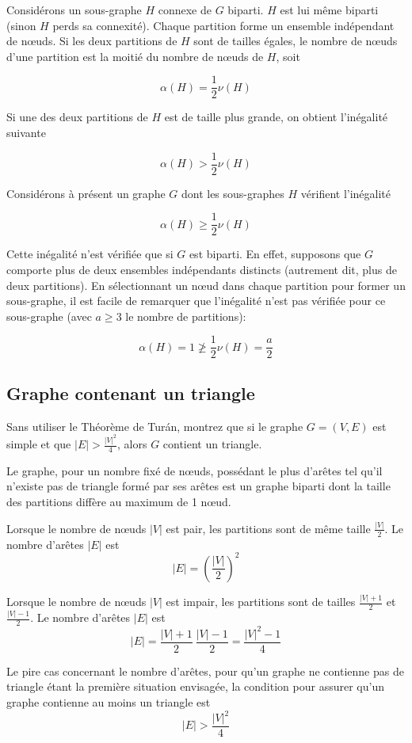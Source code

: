 \begin{solution}
Considérons un sous-graphe $H$ connexe de $G$ biparti. $H$ est lui même biparti (sinon $H$ perds sa connexité).
Chaque partition forme un ensemble indépendant de nœuds. Si les deux partitions de $H$ sont de tailles égales, le nombre de nœuds d'une partition est la moitié du nombre de nœuds de $H$, soit

$$\alpha(H)=\frac{1}{2}\nu(H)$$

Si une des deux partitions de $H$ est de taille plus grande, on obtient l'inégalité suivante

$$\alpha(H)>\frac{1}{2}\nu(H)$$

Considérons à présent un graphe $G$ dont les sous-graphes $H$ vérifient l'inégalité

$$\alpha(H)\geqslant\frac{1}{2}\nu(H)$$

Cette inégalité n'est vérifiée que si $G$ est biparti. En effet, supposons que $G$ comporte plus de deux ensembles indépendants distincts (autrement dit, plus de deux partitions). En sélectionnant un nœud dans chaque partition pour former un sous-graphe, il est facile de remarquer que l'inégalité n'est pas vérifiée pour ce sous-graphe (avec $a\geqslant3$ le nombre de partitions):

$$\alpha(H)=1\ngeqslant\frac{1}{2}\nu(H)=\frac{a}{2}$$
\end{solution}

\subsection{Graphe contenant un triangle}
Sans utiliser le Théorème de Turán, montrez que si le graphe $G = (V, E)$ est simple et que $|E| > \frac{|V|^2}{4}$, alors $G$ contient un triangle.

\begin{solution}
Le graphe, pour un nombre fixé de nœuds, possédant le plus d'arêtes tel qu'il n'existe pas de triangle formé par ses arêtes est un graphe biparti dont la taille des partitions diffère au maximum de 1 nœud.

Lorsque le nombre de nœuds $|V|$ est pair, les partitions sont de même taille $\frac{|V|}{2}$. Le nombre d'arêtes $|E|$ est $$|E|=\left(\frac{|V|}{2}\right)^2$$

Lorsque le nombre de nœuds $|V|$ est impair, les partitions sont de tailles $\frac{|V|+1}{2}$ et $\frac{|V|-1}{2}$. Le nombre d'arêtes $|E|$ est $$|E|=\frac{|V|+1}{2}~\frac{|V|-1}{2}=\frac{|V|^2-1}{4}$$

Le pire cas concernant le nombre d'arêtes, pour qu'un graphe ne contienne pas de triangle étant la première situation envisagée, la condition pour assurer qu'un graphe contienne au moins un triangle est $$|E|>\frac{|V|^2}{4}$$
\end{solution}
